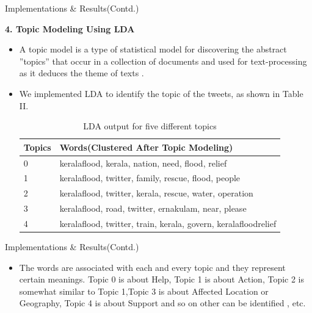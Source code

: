 \documentclass[10pt]{beamer}
\begin{document}
\begin{frame}[fragile]{ Implementations \& Results(Contd.)}

\textbf{4. Topic Modeling Using LDA}

\begin{itemize}

\item A topic
model is a type of statistical model for discovering the abstract
”topics” that occur in a collection of documents  and used for text-processing as
it deduces the theme of texts . 
\item We implemented LDA
to identify the topic of the tweets, as shown in Table II.
\begin{table}[htbp]
	\centering
\begin{tabular}{ |p{0.8cm}|p{7.5cm}| } 
 \hline
 \textbf{Topics} & \textbf{Words(Clustered After Topic Modeling)}\\
 \hline
0 & keralaflood, kerala, nation, need, flood, relief \\
\hline
 1 &  keralaflood, twitter, family, rescue, flood, people \\ 
 \hline
 2 &keralaflood, twitter, kerala, rescue, water, operation\\
 \hline
  3 & keralaflood, road, twitter, ernakulam, near, please\\ 
  \hline
   4 & keralaflood, twitter, train, kerala, govern, keralafloodrelief\\ 
 \hline
\end{tabular}
\label{lda}
\caption{LDA output for five different topics}
\end{table}
\end{itemize}




\end{frame}


\begin{frame}[fragile]{ Implementations \& Results(Contd.)}

\begin{itemize}


\item The words are associated with each and every topic and they
represent certain meanings. Topic 0 is about Help, Topic 1 is
about Action, Topic 2 is somewhat similar to Topic 1,Topic 3 is
about Affected Location or Geography, Topic 4 is about Support
and so on other can be identified , etc.



\end{itemize}



\end{frame}
\end{document}

